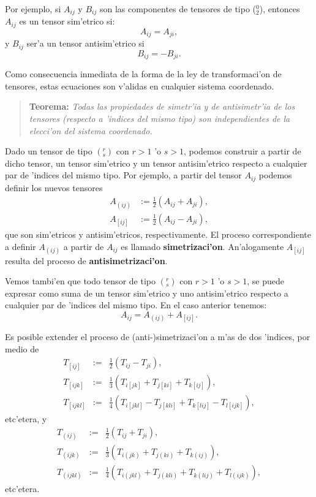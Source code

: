Por ejemplo, si $A_{ij}$ y $B_{ij}$ son las componentes de tensores de tipo
($_2^0$), entonces $A_{ij}$ es un tensor sim'etrico si:
\begin{equation}
A_{ij}=A_{ji}, \label{sim1}
\end{equation}
y $B_{ij}$ ser'a un tensor antisim'etrico si
\begin{equation}
B_{ij}=-B_{ji}. \label{sim2}
\end{equation}

Como consecuencia inmediata de la forma de la ley de transformaci'on de
tensores, estas ecuaciones son v'alidas en cualquier sistema coordenado.

\begin{quotation}
\textbf{Teorema:} \textit{Todas las propiedades de simetr'ia y de
antisimetr'ia de los tensores (respecto a 'indices del mismo tipo) son independientes de la elecci'on del sistema coordenado.}
\end{quotation}

Dado un tensor de tipo $(^r_s)$ con $r>1$ 'o $s>1$, podemos construir
a partir de dicho tensor, un tensor sim'etrico y un tensor
antisim'etrico respecto a cualquier par de 'indices del mismo tipo. Por ejemplo, a partir del tensor $A_{ij}$ podemos definir los nuevos tensores
\begin{align}
A_{(ij)} & :=\frac{1}2\left( A_{ij}+A_{ji}\right) ,\label{sim3}\\
A_{[ij]} & :=\frac{1}2\left( A_{ij}-A_{ji}\right) ,\nonumber
\end{align}
que son sim'etricos y antisim'etricos, respectivamente. El proceso
correspondiente a definir $A_{(ij)}$ a partir de $A_{ij}$ es llamado \textbf{simetrizaci'on}. An'alogamente $A_{[ij]}$ resulta del proceso de \textbf{antisimetrizaci'on}.

Vemos tambi'en que todo tensor de tipo $(^r_s)$ con $r>1$ 'o $s>1$, se
puede expresar como suma de un tensor sim'etrico y uno antisim'etrico respecto a
cualquier par de 'indices del mismo tipo. En el caso anterior
tenemos:
\begin{equation}
A_{ij}=A_{(ij)}+A_{[ij]}.\label{sim4}
\end{equation}

Es posible extender el proceso de (anti-)simetrizaci'on a m'as de dos 'indices, por
medio de
\begin{eqnarray}
T_{[ij]}&:=&\frac{1}2(T_{ij}-T_{ji}), \\
T_{[ijk]}&:=&\frac{1}{3}(T_{i[jk]}+T_{j[ki]}+T_{k[ij]}), \label{as3}\\
T_{[ijkl]}&:=&\frac{1}{4}(T_{i[jkl]}-T_{j[kli]}+T_{k[lij]}-T_{l[ijk]}),
\end{eqnarray}
etc'etera, y
\begin{eqnarray}
T_{(ij)}&:=&\frac{1}2(T_{ij}+T_{ji}), \\
T_{(ijk)}&:=&\frac{1}{3}(T_{i(jk)}+T_{j(ki)}+T_{k(ij)}), \\
T_{(ijkl)}&:=&\frac{1}{4}(T_{i(jkl)}+T_{j(kli)}+T_{k(lij)}+T_{l(ijk)}),
\end{eqnarray}
etc'etera.

